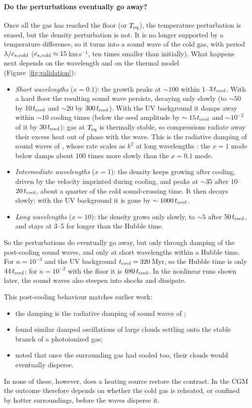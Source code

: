 \documentclass[11pt]{article}
\newcommand{\tcool}{t_{\rm cool}}
\newcommand{\Teq}{T_{\rm eq}}
\begin{document}
\paragraph{Do the perturbations eventually go away?} Once all the gas has reached
the floor (or $\Teq$), the temperature perturbation is erased, but the density
perturbation is not. It is no longer supported by a temperature difference, so it
turns into a sound wave of the cold gas, with period $\lambda/c_{s,\rm cold}$
($c_{s,\rm cold}\approx15$\,km\,s$^{-1}$, ten times smaller than initially). What
happens next depends on the wavelength and on the thermal model
(Figure~\ref{fig:validation}):
\begin{itemize}
\item \emph{Short wavelengths} ($x=0.1$): the growth peaks at $\sim100$ within
  $1$--$3\,\tcool$. With a hard floor the resulting sound wave persists, decaying
  only slowly (to $\sim50$ by $10\,\tcool$ and $\sim20$ by $300\,\tcool$). With the
  UV background it damps away within $\sim10$ cooling times (below the seed amplitude by
  $\sim15\,\tcool$ and $\sim10^{-2}$ of it by $30\,\tcool$): gas at $\Teq$ is thermally stable, so compressions
  radiate away their excess heat out of phase with the wave. This is the radiative
damping of sound waves of \citet{field65}, whose rate scales as $k^2$ at long
wavelengths \citep[see also][]{waters19}: the $x=1$ mode below damps about 100
times more slowly than the $x=0.1$ mode.
\item \emph{Intermediate wavelengths} ($x=1$): the density keeps growing after
  cooling, driven by the velocity imprinted during cooling, and peaks at $\sim35$
  after $10$--$20\,\tcool$, about a quarter of the cold sound-crossing time. It then
  decays slowly; with the UV background it is gone by $\sim1000\,\tcool$.
\item \emph{Long wavelengths} ($x=10$): the density grows only slowly, to $\sim5$
  after $50\,\tcool$, and stays at 3--5 for longer than the Hubble time.
\end{itemize}
So the perturbations do eventually go away, but only through damping of the
post-cooling sound waves, and only at short wavelengths within a Hubble time.
For $n=10^{-3}$ and the UV background $\tcool=320$\,Myr, so the Hubble time is only
$44\,\tcool$; for $n=10^{-2}$ with the floor it is $680\,\tcool$. In the nonlinear
runs shown later, the sound waves also steepen into shocks and dissipate.

This post-cooling behaviour matches earlier work:
\begin{itemize}
\item the damping is the radiative damping of sound waves of \citet{field65};
\item \citet{waters19} found similar damped oscillations of large clouds settling onto
  the stable branch of a photoionized gas;
\item \citet{schwarz72} noted that once the surrounding gas had cooled too, their
  clouds would eventually disperse.
\end{itemize}
In none of these, however, does a heating source restore the contrast. In the CGM
the outcome therefore depends on whether the cold gas is reheated, or confined by
hotter surroundings, before the waves disperse it.
\end{document}
